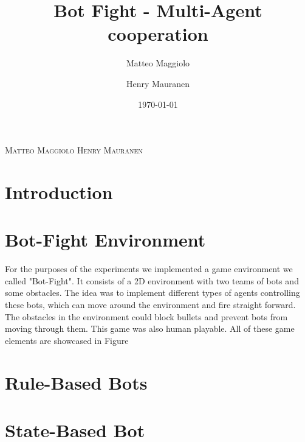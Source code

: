 \documentclass{article}
\title{Bot Fight - Multi-Agent cooperation}
\author{Matteo Maggiolo \and Henry Mauranen}
\date{\today}
\begin{document}
	
	\makeatletter
	\begin{center}
		{\scshape\LARGE{\@title}\par}
		{\scshape\normalsize Matteo Maggiolo \hspace{2cm} Henry Mauranen \par}
		{\scshape\normalsize\@date\par}
	\end{center}
	\makeatother
	
	\section{Introduction}
	
	
	
	\section{Bot-Fight Environment}
	For the purposes of the experiments we implemented a game environment we called "Bot-Fight". It consists of a 2D environment with two teams of bots and some obstacles. The idea was to implement different types of agents controlling these bots, which can move around the environment and fire straight forward. The obstacles in the environment could block bullets and prevent bots from moving through them. This game was also human playable. All of these game elements are showcased in Figure 
	
	
	\section{Rule-Based Bots}
	
	
	
	\section{State-Based Bot}
	
	
	
\end{document}
